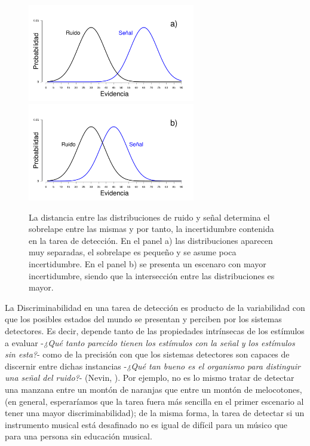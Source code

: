\begin{figure}[th]
\centering
\includegraphics[width=0.65\textwidth]{Figures/Overlap_Small}\\ 
\includegraphics[width=0.65\textwidth]{Figures/Overlap_Big} 
\caption[La detección como una tarea con incertidumbre: el sobrelape entre las distribuciones]{La distancia entre las distribuciones de ruido y señal determina el sobrelape entre las mismas y por tanto, la incertidumbre contenida en la tarea de detección. En el panel a) las distribuciones aparecen muy separadas, el sobrelape es pequeño y se asume poca incertidumbre.  En el panel b) se presenta un escenaro con mayor incertidumbre, siendo que la intersección entre las distribuciones es mayor.}
\label{fig:Overlap}
\end{figure}

La Discriminabilidad en una tarea de detección es producto de la variabilidad con que los posibles estados del mundo se presentan y perciben por los sistemas detectores. Es decir, depende tanto de las propiedades intrínsecas de los estímulos a evaluar -\textit{¿Qué tanto parecido tienen los estímulos con la señal y los estímulos sin esta?}- como de la precisión con que los sistemas detectores son capaces de discernir entre dichas instancias -\textit{¿Qué tan bueno es el organismo para distinguir una señal del ruido?}- (Nevin, \citeyear{Nevin1969}). Por ejemplo, no es lo mismo tratar de detectar una manzana entre un montón de naranjas que entre un montón de melocotones, (en general, esperaríamos que la tarea fuera más sencilla en el primer escenario al tener una mayor discriminabilidad); de la misma forma, la tarea de detectar si un instrumento musical está desafinado no es igual de difícil para un músico que para una persona sin educación musical.\\

